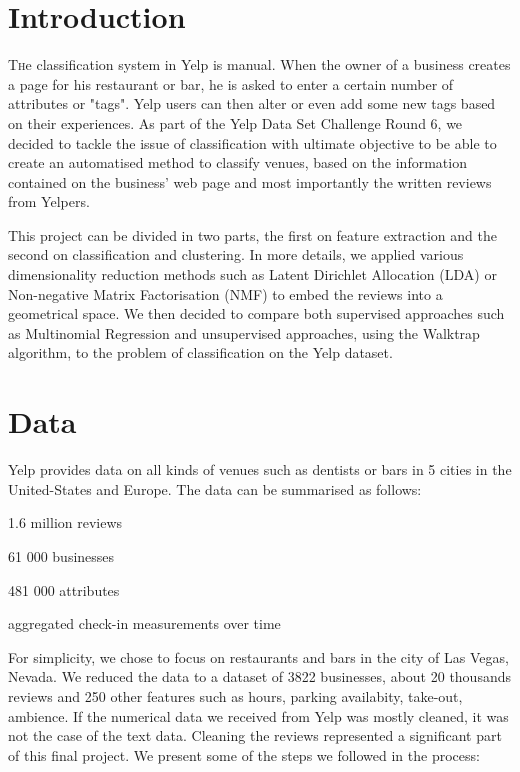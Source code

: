 \documentclass[twoside]{article}
\begin{document}
\begin{multicols}{2} %

\section{Introduction}

\lettrine[nindent=0em,lines=1]{T}he classification system in Yelp is manual. When the owner of a business creates a page for his restaurant or bar, he is asked to enter a certain number of attributes or "tags". Yelp users can then alter or even add some new tags based on their experiences. As part of the Yelp Data Set Challenge Round 6, we decided to tackle the issue of classification with ultimate objective to be able to create an automatised method to classify venues, based on the information contained on the business' web page and most importantly the written reviews from Yelpers. 

\noindent This project can be divided in two parts, the first on feature extraction and the second on classification and clustering. In more details, we applied various dimensionality reduction methods such as Latent Dirichlet Allocation (LDA) or Non-negative Matrix Factorisation (NMF) to embed the reviews into a geometrical space. We then decided to compare both supervised approaches such as Multinomial Regression and unsupervised approaches, using the Walktrap algorithm, to the problem of classification on the Yelp dataset.
\columnbreak
\section{Data}

Yelp provides data on all kinds of venues such as dentists or bars in 5 cities in the United-States and Europe. The data can be summarised as follows:

\begin{compactitem}
	\item 1.6 million reviews
	\item 61 000 businesses		
	\item 481 000 attributes 
	\item aggregated check-in measurements over time
\end{compactitem}

\noindent For simplicity, we chose to focus on restaurants and bars in the city of Las Vegas, Nevada. We reduced the data to a dataset of 3822 businesses, about 20 thousands reviews and 250 other features such as hours, parking availabity, take-out, ambience. If the numerical data we received from Yelp was mostly cleaned, it was not the case of the text data. Cleaning the reviews represented a significant part of this final project. We present some of the steps we followed in the process:\\


\end{multicols}
\end{document}
